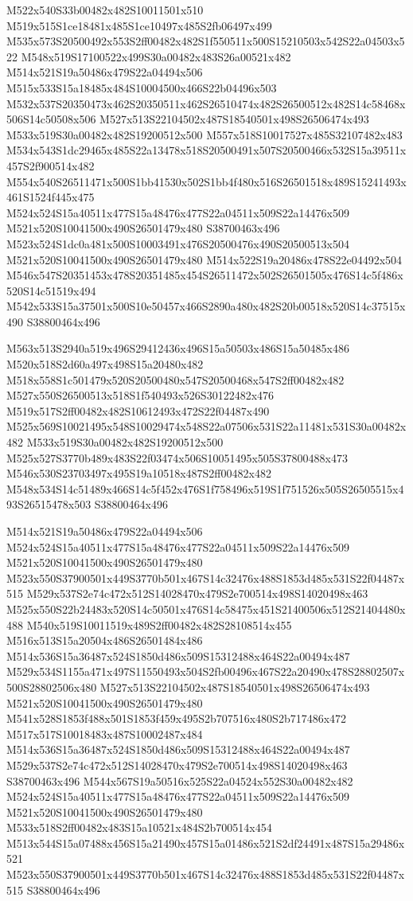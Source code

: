 \documentclass{article}
\begin{document}
\begin{multicols}{2}
M522x540S33b00482x482S10011501x510 M519x515S1ce18481x485S1ce10497x485S2fb06497x499 M535x573S20500492x553S2ff00482x482S1f550511x500S15210503x542S22a04503x522 M548x519S17100522x499S30a00482x483S26a00521x482 M514x521S19a50486x479S22a04494x506 M515x533S15a18485x484S10004500x466S22b04496x503 M532x537S20350473x462S20350511x462S26510474x482S26500512x482S14c58468x506S14c50508x506 M527x513S22104502x487S18540501x498S26506474x493 M533x519S30a00482x482S19200512x500 M557x518S10017527x485S32107482x483 M534x543S1dc29465x485S22a13478x518S20500491x507S20500466x532S15a39511x457S2f900514x482 M554x540S26511471x500S1bb41530x502S1bb4f480x516S26501518x489S15241493x461S1524f445x475 M524x524S15a40511x477S15a48476x477S22a04511x509S22a14476x509 M521x520S10041500x490S26501479x480 S38700463x496 M523x524S1dc0a481x500S10003491x476S20500476x490S20500513x504 M521x520S10041500x490S26501479x480 M514x522S19a20486x478S22e04492x504 M546x547S20351453x478S20351485x454S26511472x502S26501505x476S14c5f486x520S14c51519x494 M542x533S15a37501x500S10e50457x466S2890a480x482S20b00518x520S14c37515x490 S38800464x496

M563x513S2940a519x496S29412436x496S15a50503x486S15a50485x486 M520x518S2d60a497x498S15a20480x482 M518x558S1c501479x520S20500480x547S20500468x547S2ff00482x482 M527x550S26500513x518S1f540493x526S30122482x476 M519x517S2ff00482x482S10612493x472S22f04487x490 M525x569S10021495x548S10029474x548S22a07506x531S22a11481x531S30a00482x482 M533x519S30a00482x482S19200512x500 M525x527S3770b489x483S22f03474x506S10051495x505S37800488x473 M546x530S23703497x495S19a10518x487S2ff00482x482 M548x534S14c51489x466S14c5f452x476S1f758496x519S1f751526x505S26505515x493S26515478x503 S38800464x496

M514x521S19a50486x479S22a04494x506 M524x524S15a40511x477S15a48476x477S22a04511x509S22a14476x509 M521x520S10041500x490S26501479x480 M523x550S37900501x449S3770b501x467S14c32476x488S1853d485x531S22f04487x515 M529x537S2e74c472x512S14028470x479S2e700514x498S14020498x463 M525x550S22b24483x520S14c50501x476S14c58475x451S21400506x512S21404480x488 M540x519S10011519x489S2ff00482x482S28108514x455 M516x513S15a20504x486S26501484x486 M514x536S15a36487x524S1850d486x509S15312488x464S22a00494x487 M529x534S1155a471x497S11550493x504S2fb00496x467S22a20490x478S28802507x500S28802506x480 M527x513S22104502x487S18540501x498S26506474x493 M521x520S10041500x490S26501479x480 M541x528S1853f488x501S1853f459x495S2b707516x480S2b717486x472 M517x517S10018483x487S10002487x484 M514x536S15a36487x524S1850d486x509S15312488x464S22a00494x487 M529x537S2e74c472x512S14028470x479S2e700514x498S14020498x463 S38700463x496 M544x567S19a50516x525S22a04524x552S30a00482x482 M524x524S15a40511x477S15a48476x477S22a04511x509S22a14476x509 M521x520S10041500x490S26501479x480 M533x518S2ff00482x483S15a10521x484S2b700514x454 M513x544S15a07488x456S15a21490x457S15a01486x521S2df24491x487S15a29486x521 M523x550S37900501x449S3770b501x467S14c32476x488S1853d485x531S22f04487x515 S38800464x496


\end{multicols}
\end{document}
